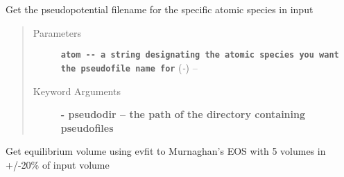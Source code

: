 \documentclass[letterpaper,10pt,english]{sphinxmanual}
\begin{document}

\begin{fulllineitems}
\label{scfuj:scfuj.__getPAOfilename}
Get the pseudopotential filename for the specific atomic species in input
\begin{quote}\begin{description}
\item[{Parameters}] \leavevmode
\textbf{\texttt{atom -{-} a string designating the atomic species you want the pseudofile name for}} (\emph{-}) -- 

\item[{Keyword Arguments}] \leavevmode
\textbf{- pseudodir -- the path of the directory containing pseudofiles}

\end{description}\end{quote}

\end{fulllineitems}


\begin{fulllineitems}
\label{scfuj:scfuj.__oneMinimizeCalcs}
Get equilibrium volume using evfit to Murnaghan's EOS with 5 volumes in +/-20\% of input volume

\end{fulllineitems}

\end{document}
